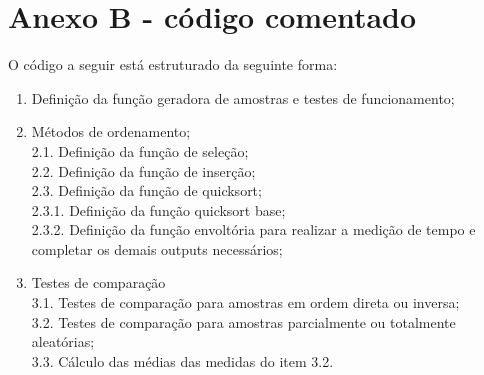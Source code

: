 \documentclass[
]{article}
\providecommand{\tightlist}{%
  \setlength{\itemsep}{0pt}\setlength{\parskip}{0pt}}
\begin{document}
\newpage

\hypertarget{anexo-b---cuxf3digo-comentado}{%
\section*{Anexo B - código
comentado}\label{anexo-b---cuxf3digo-comentado}}

O código a seguir está estruturado da seguinte forma:

\begin{enumerate}
\def\labelenumi{\arabic{enumi}.}
\tightlist
\item
  Definição da função geradora de amostras e testes de funcionamento;\\
\item
  Métodos de ordenamento;\\
  2.1. Definição da função de seleção;\\
  2.2. Definição da função de inserção;\\
  2.3. Definição da função de quicksort;\\
  2.3.1. Definição da função quicksort base;\\
  2.3.2. Definição da função envoltória para realizar a medição de tempo
  e completar os demais outputs necessários;
\item
  Testes de comparação\\
  3.1. Testes de comparação para amostras em ordem direta ou inversa;\\
  3.2. Testes de comparação para amostras parcialmente ou totalmente
  aleatórias;\\
  3.3. Cálculo das médias das medidas do item 3.2.
\end{enumerate}
\end{document}
